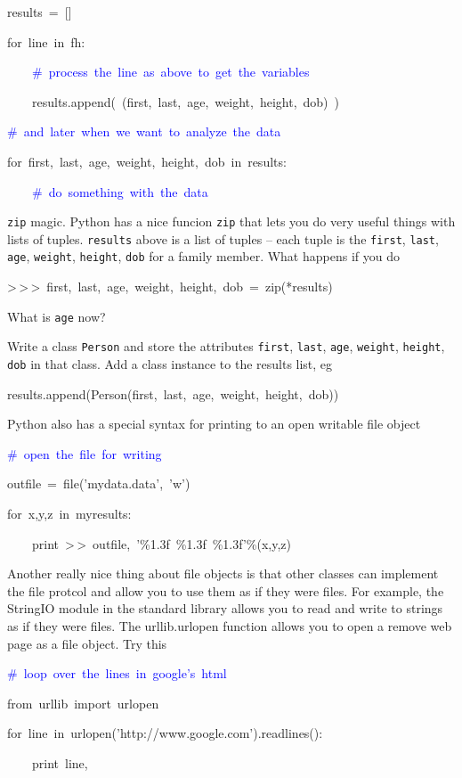 \begin{lyxcode}
results~=~{[}]

for~line~in~fh:

~~~~\textcolor{blue}{\#~process~the~line~as~above~to~get~the~variables}

~~~~results.append(~(first,~last,~age,~weight,~height,~dob)~)





\textcolor{blue}{\#~and~later~when~we~want~to~analyze~the~data}

for~first,~last,~age,~weight,~height,~dob~in~results:

~~~~\textcolor{blue}{\#~do~something~with~the~data}
\end{lyxcode}
\begin{xca}
\texttt{zip} magic.  Python has a nice funcion \texttt{zip} that lets
you do very useful things with lists of tuples.  \texttt{results}
above is a list of tuples -- each tuple is the \texttt{first}, \texttt{last},
\texttt{age}, \texttt{weight}, \texttt{height}, \texttt{dob} for a
family member.  What happens if you do 
\end{xca}
\begin{lyxcode}
>\,{}>\,{}>~first,~last,~age,~weight,~height,~dob~=~zip({*}results)
\end{lyxcode}
What is \texttt{age} now?

\begin{xca}
Write a class \texttt{Person} and store the attributes \texttt{first},
\texttt{last}, \texttt{age}, \texttt{weight}, \texttt{height}, \texttt{dob}
in that class.  Add a class instance to the results list, eg
\end{xca}
\begin{lyxcode}
results.append(Person(first,~last,~age,~weight,~height,~dob))
\end{lyxcode}
Python also has a special syntax for printing to an open writable
file object

\begin{lyxcode}
\textcolor{blue}{\#~open~the~file~for~writing}

outfile~=~file('mydata.data',~'w')~

for~x,y,z~in~myresults:

~~~~print~>\,{}>~outfile,~'\%1.3f~\%1.3f~\%1.3f'\%(x,y,z)
\end{lyxcode}
Another really nice thing about file objects is that other classes
can implement the file protcol and allow you to use them as if they
were files. For example, the StringIO module in the standard library
allows you to read and write to strings as if they were files. The
urllib.urlopen function allows you to open a remove web page as a
file object. Try this

\begin{lyxcode}
\textcolor{blue}{\#~loop~over~the~lines~in~google's~html}

from~urllib~import~urlopen

for~line~in~urlopen('http://www.google.com').readlines():

~~~~print~line,
\end{lyxcode}

